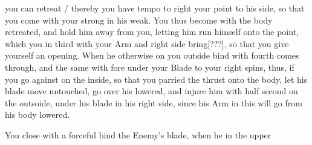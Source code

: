 you can retreat / thereby you have tempo to right your point to his
side, so that you come with your strong in his weak. You thus become
with the body retreated, and hold him away from you, letting him run
himself onto the point, which you in third with your Arm and right
side bring[???], so that you give yourself an opening.
When he otherwise on you outside bind with fourth comes through, and
the same with fore under your Blade to your right spins, thus, if
you go against on the inside, so that you parried the thrust onto the
body, let his blade move untouched, go over his lowered, and injure
him with half second on the outsoide, under his blade in his right
side, since his Arm in this will go from his body lowered.

You close with a forceful bind the Enemy's blade, when he in the upper
